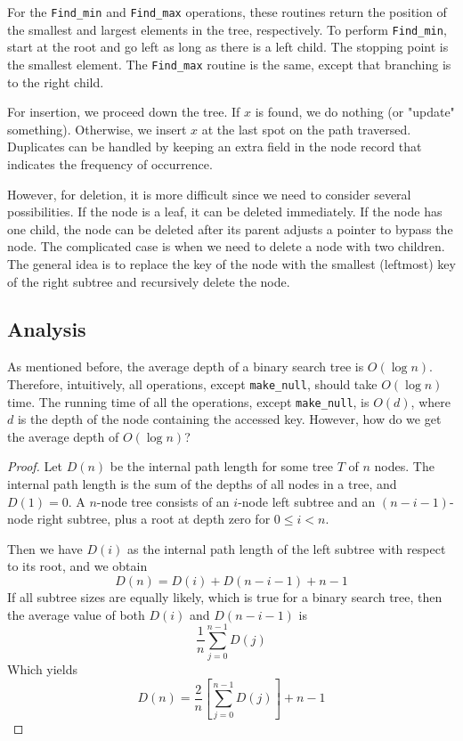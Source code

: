 For the \verb|Find_min| and \verb|Find_max| operations, these routines return the position of the smallest and largest elements in the tree, respectively. To perform \verb|Find_min|, start at the root and go left as long as there is a left child. The stopping point is the smallest element. The \verb|Find_max| routine is the same, except that branching is to the right child.

For insertion, we proceed down the tree. If \(x\) is found, we do nothing (or "update" something). Otherwise, we insert \(x\) at the last spot on the path traversed. Duplicates can be handled by keeping an extra field in the node record that indicates the frequency of occurrence.

However, for deletion, it is more difficult since we need to consider several possibilities. If the node is a leaf, it can be deleted immediately. If the node has one child, the node can be deleted after its parent adjusts a pointer to bypass the node. The complicated case is when we need to delete a node with two children. The general idea is to replace the key of the node with the smallest (leftmost) key of the right subtree and recursively delete the node.

\subsection{Analysis}
As mentioned before, the average depth of a binary search tree is \(O(\log n)\). Therefore, intuitively, all operations, except \verb|make_null|, should take \(O(\log n)\) time. The running time of all the operations, except \verb|make_null|, is \(O(d)\), where \(d\) is the depth of the node containing the accessed key. However, how do we get the average depth of \(O(\log n)\)?

\begin{proof}
  Let \(D(n)\) be the internal path length for some tree \(T\) of \(n\) nodes. The internal path length is the sum of the depths of all nodes in a tree, and \(D(1) = 0\). A \(n\)-node tree consists of an \(i\)-node left subtree and an \((n - i - 1)\)-node right subtree, plus a root at depth zero for \(0 \leq i < n\).

  Then we have \(D(i)\) as the internal path length of the left subtree with respect to its root, and we obtain
  \[
    D(n) = D(i) + D(n - i - 1) + n - 1
  \]
  If all subtree sizes are equally likely, which is true for a binary search tree, then the average value of both \(D(i)\) and \(D(n - i - 1)\) is
  \[
    \dfrac{1}{n} \sum_{j = 0}^{n - 1} D(j)
  \]
  Which yields
  \[
    D(n) = \dfrac{2}{n} \left[\sum_{j = 0}^{n - 1} D(j)\right] + n - 1
  \]
\end{proof}

